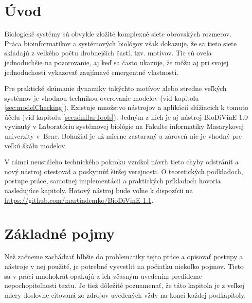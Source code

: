 \documentclass[11pt,final,oneside]{fithesis}
\begin{document}
\MainMatter
\tableofcontents
\chapter*{\' Uvod}
Biologick\'e syst\'emy s\'u obvykle zlo\v zit\'e komplexn\'e siete obrovsk\'ych rozmerov. Pr\'aca bioinformatikov a syst\'emov\'ych biol\'ogov v\v sak 
dokazuje, 
\v ze sa tieto siete skladaj\'u z ve\v lk\'eho po\v ctu drobnej\v s\'ich \v cast\'i, tzv. mot\'ivov. Tie s\'u ove\v la jednoduch\v sie na pozorovanie, aj 
ke\v d sa \v casto ukazuje, \v ze m\^ o\v zu aj pri svojej jednoduchosti vykazova\v t zauj\'imav\'e emergentn\'e vlastnosti.

Pre praktick\'e sk\'umanie dynamiky tak\'ychto mot\'ivov alebo stredne ve\v lk\'ych syst\'emov je vhodnou technikou overovanie modelov (vi\v d kapitolu
\ref{sec:modelChecking}). Existuje mno\v zstvo n\'astrojov a aplik\'aci\'i sl\'u\v ziacich k tomuto \'u\v celu (vi\v d kapitolu \ref{sec:similarTools}). Jedn\'ym z nich
je aj n\'astroj BioDiVinE 1.0 vyvinut\'y v Laborat\'oriu syst\'emovej biol\'ogie na Fakulte informatiky Masarykovej univerzity v~Brne. Bohu\v zia\v l je u\v z
mierne zastaran\'y a z\'arove\v n nie je vhodn\'y pre ve\v lk\'u \v sk\'alu modelov. 

V r\'amci neust\'aleho technick\'eho pokroku vznikol n\'avrh tieto chyby 
odstr\'ani\v t a nov\'y n\'astroj otestova\v t a poskytn\'u\v t \v sir\v sej verejnosti. O teoretick\'ych podkladoch, postupe pr\'ace, samotnej 
implement\'acii a praktick\'ych pr\'ikladoch hovoria nasleduj\'uce kapitoly. Hotov\'y n\'astroj bude vo\v lne k dispoz\'icii na \url{https://github.com/martindemko/BioDiVinE-1.1}.

\chapter{Z\' akladn\' e pojmy}
Ne\v z za\v cneme zach\' adza\v t hlb\v sie do problematiky tejto pr\' ace a opisova\v t postupy a n\' astroje v nej pou\v zit\' e, 
je potrebn\' e vysvetli\v t na po\v ciatku nieko\v lko pojmov. Tieto sa v pr\' aci mnohokr\' at opakuj\' u a ich v\v casn\' ym uveden\' im
pred\' ideme nepochopite\v lnosti textu. Je tie\v z d\^ ole\v zit\'e poznamena\v t, \v ze t\'ato kapitola je z ve\v lkej miery doslovne citovan\'a
zo zdrojov uveden\'ych v\v zdy na konci ka\v zdej podkapitoly.
\end{document}
